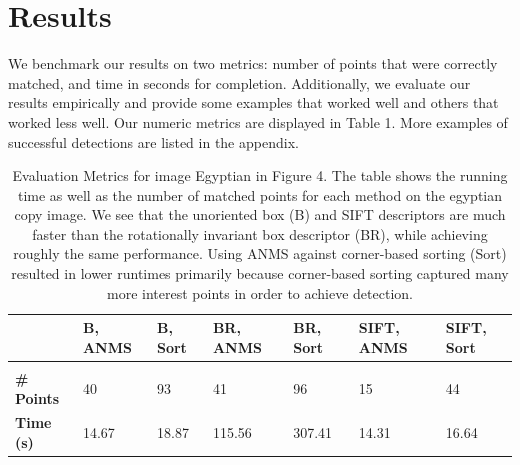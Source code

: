 \documentclass[12pt]{article}
\begin{document}
\section*{Results}

We benchmark our results on two metrics: number of points that were correctly matched, and time in seconds for completion. Additionally, we evaluate our results empirically and provide some examples that worked well and others that worked less well. Our numeric metrics are displayed in Table 1. More examples of successful detections are listed in the appendix.

\begin{table}[bp]
\caption{Evaluation Metrics for image Egyptian in Figure 4. The table shows the running time as well as the number of matched points for each method on the egyptian copy image. We see that the unoriented box (B) and SIFT descriptors are much faster than the rotationally invariant box descriptor (BR), while achieving roughly the same performance. Using ANMS against corner-based sorting (Sort) resulted in lower runtimes primarily because corner-based sorting captured many more interest points in order to achieve detection.}
\label{image}
\begin{center}
\begin{tabular}{l|llllll}
\multicolumn{1}{l}{} & \multicolumn{1}{l}{\bf B, ANMS} & \multicolumn{1}{l}{\bf B, Sort} & \multicolumn{1}{l}{\bf BR, ANMS} & \multicolumn{1}{l}{\bf BR, Sort} & \multicolumn{1}{l}{\bf SIFT, ANMS} & \multicolumn{1}{l}{\bf SIFT, Sort}
\\ \hline \\
{\bf \# Points} & 40 & 93 & 41 & 96 & 15 & 44 \\
{\bf Time (s)} & 14.67 & 18.87 & 115.56 & 307.41 & 14.31 & 16.64 \\
\end{tabular}
\end{center}
\end{table}
\end{document}
